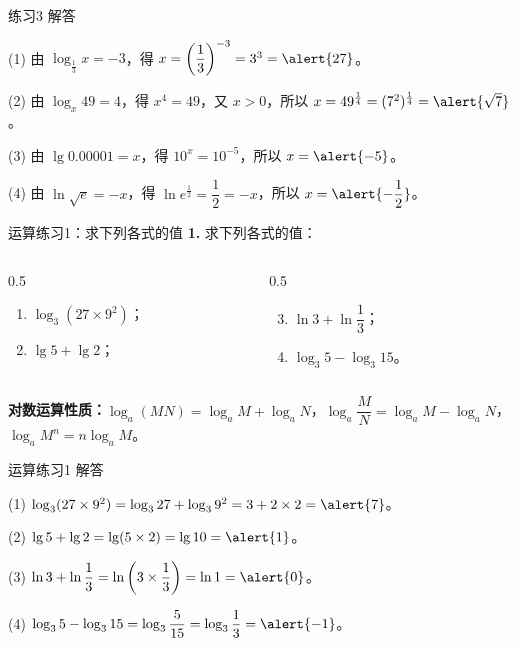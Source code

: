 \documentclass[10pt,aspectratio=169,serif]{beamer}
\begin{document}
\begin{frame}[t]{练习3 解答}
\begin{tcolorbox}[colback=orange!10,colframe=orange,title=\textbf{解}]
(1) 由 $\log_{\frac{1}{3}} x = -3$，得 $x = \left(\dfrac{1}{3}\right)^{-3} = 3^3 = \alert{27}$。

(2) 由 $\log_x 49 = 4$，得 $x^4 = 49$，又 $x>0$，所以 $x = 49^{\frac{1}{4}} = (7^2)^{\frac{1}{4}} = \alert{\sqrt{7}}$。

(3) 由 $\lg 0.00001 = x$，得 $10^x = 10^{-5}$，所以 $x = \alert{-5}$。

(4) 由 $\ln\sqrt{e} = -x$，得 $\ln e^{\frac{1}{2}} = \dfrac{1}{2} = -x$，所以 $x = \alert{-\dfrac{1}{2}}$。
\end{tcolorbox}
\end{frame}

\begin{frame}[t]{运算练习1：求下列各式的值}
\textbf{1.} 求下列各式的值：

\vspace{0.5em}
\begin{columns}[t]
\begin{column}{0.5\textwidth}
\begin{enumerate}
  \item $\log_3(27 \times 9^2)$；
  \item $\lg 5 + \lg 2$；
\end{enumerate}
\end{column}
\begin{column}{0.5\textwidth}
\begin{enumerate}\setcounter{enumi}{2}
  \item $\ln 3 + \ln\dfrac{1}{3}$；
  \item $\log_3 5 - \log_3 15$。
\end{enumerate}
\end{column}
\end{columns}

\vspace{1em}
\small\textbf{对数运算性质：}$\log_a(MN)=\log_a M+\log_a N$，$\log_a\dfrac{M}{N}=\log_a M-\log_a N$，$\log_a M^n=n\log_a M$。
\end{frame}

\begin{frame}[t]{运算练习1 解答}
\begin{tcolorbox}[colback=orange!10,colframe=orange,title=\textbf{解}]
(1) $\log_3(27\times 9^2) = \log_3 27 + \log_3 9^2 = 3 + 2\times 2 = \alert{7}$。

(2) $\lg 5 + \lg 2 = \lg(5\times 2) = \lg 10 = \alert{1}$。

(3) $\ln 3 + \ln\dfrac{1}{3} = \ln\left(3\times\dfrac{1}{3}\right) = \ln 1 = \alert{0}$。

(4) $\log_3 5 - \log_3 15 = \log_3\dfrac{5}{15} = \log_3\dfrac{1}{3} = \alert{-1}$。
\end{tcolorbox}
\end{frame}
\end{document}
